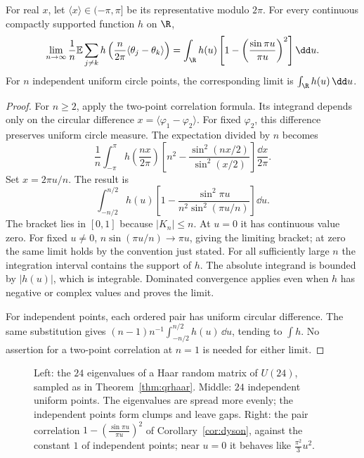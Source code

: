 \begin{corollary}\label{cor:dyson}
For real $x$, let $\langle x\rangle\in(-\pi,\pi]$ be its representative
modulo $2\pi$. For every continuous compactly supported function $h$ on
$\R$,
\[
 \lim_{n\to\infty}\frac1n\mathbb E\sum_{j\ne k}
 h\left(\frac n{2\pi}\langle\theta_j-\theta_k\rangle\right)
 =\int_\R h(u)\left[1-\left(\frac{\sin\pi u}{\pi u}\right)^2\right]\dd u.
\]
For $n$ independent uniform circle points, the corresponding limit is
$\int_\R h(u)\,\dd u$.
\end{corollary}
\begin{proof}
For $n\ge2$, apply the two-point correlation formula.
Its integrand depends only on the circular difference
$x=\langle\varphi_1-\varphi_2\rangle$.
For fixed $\varphi_2$, this difference preserves uniform circle measure.
The expectation divided by $n$ becomes
\[
 \frac1n\int_{-\pi}^{\pi}h\left(\frac{nx}{2\pi}\right)
 \left[n^2-\frac{\sin^2(nx/2)}{\sin^2(x/2)}\right]\frac{\dd x}{2\pi}.
\]
Set $x=2\pi u/n$. The result is
\[
 \int_{-n/2}^{n/2}h(u)
 \left[1-\frac{\sin^2\pi u}{n^2\sin^2(\pi u/n)}\right]\dd u.
\]
The bracket lies in $[0,1]$ because $|K_n|\le n$.
At $u=0$ it has continuous value zero.
For fixed $u\ne0$, $n\sin(\pi u/n)\to\pi u$, giving the limiting
bracket; at zero the same limit holds by the convention just stated.
For all sufficiently large $n$ the integration interval contains the
support of $h$. The absolute integrand is bounded by $|h(u)|$,
which is integrable. Dominated convergence applies even when $h$ has
negative or complex values and proves the limit.

For independent points, each ordered pair has uniform circular difference.
The same substitution gives
$(n-1)n^{-1}\int_{-n/2}^{n/2}h(u)\,\dd u$, tending to $\int h$.
No assertion for a two-point correlation at $n=1$ is needed for either limit.
\end{proof}

\begin{figure}[ht]
\centering
{}
\caption{Left: the $24$ eigenvalues of a Haar random matrix of $U(24)$, sampled as in Theorem~\ref{thm:qrhaar}. Middle: $24$ independent uniform points. The eigenvalues are spread more
evenly; the independent points form clumps and leave gaps. Right: the pair correlation $1-(\frac{\sin\pi u}{\pi u})^2$ of Corollary~\ref{cor:dyson}, against the constant $1$ of independent points;
near $u=0$ it behaves like $\frac{\pi^2}3u^2$.}
\label{fig:cue}
\end{figure}

